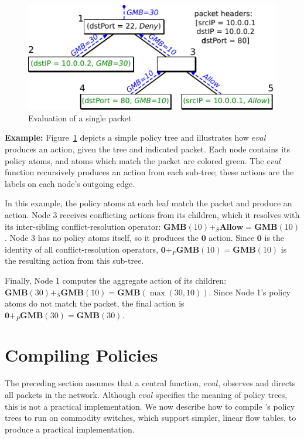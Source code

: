\begin{figure}
\centering
\includegraphics{figs/evaltree}
\caption{Evaluation of a single packet}
\label{f:evaltree}
\end{figure}


\vspace{0.5em}\noindent\textbf{Example:\space}
Figure~\ref{f:evaltree} depicts a simple policy tree
and illustrates how $\mathit{eval}$ produces an action, given the 
tree and indicated packet.
Each node contains its policy atoms, and atoms which match the packet are colored
green. The $\mathit{eval}$ function recursively produces an action from
each sub-tree; these actions are the labels on each node's outgoing edge.

In this example, the policy atoms at each leaf match the packet and produce
an action.
Node $3$ receives conflicting actions
from its children, which it resolves with its inter-sibling
conflict-resolution operator:
$\textbf{GMB}(10)
+_S \textbf{Allow} = \textbf{GMB}(10)$. Node $3$ has no policy atoms
itself, so it produces the $\textbf{0}$ action. Since $\textbf{0}$ is
the identity of all conflict-resolution operators,
  $\textbf{0} +_P \textbf{GMB}(10) = \textbf{GMB}(10)$ is the
resulting action from this sub-tree. 

Finally, Node 1 computes the aggregate action of its children:
$\textbf{GMB}(30) +_S \textbf{GMB}(10) = \textbf{GMB}(\max(30,10))$.
Since Node 1's policy atoms do not match the packet,
the final action is
$\textbf{0} +_P \textbf{GMB}(30) = \textbf{GMB}(30)$.


\section{Compiling Policies}\label{s:lin}

The preceding section assumes that a central function,
$\mathit{eval}$, observes and directs all packets in the network.
Although $\mathit{eval}$ specifies the meaning of policy trees, this is not a
practical implementation. We now describe how to compile \treelang's
policy trees to run on commodity switches, which support simpler, linear
flow tables, to produce a practical implementation.

